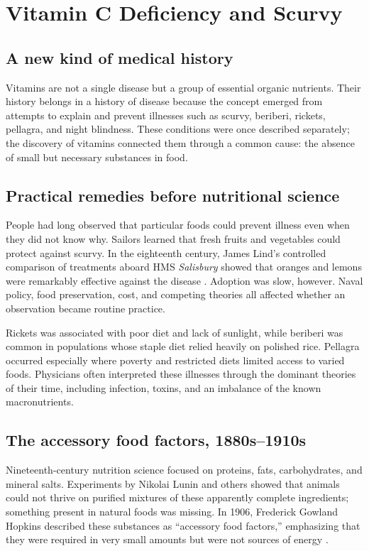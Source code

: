 \documentclass[12pt,oneside]{book}
\begin{document}
\chapter[Vitamin C Deficiency and Scurvy]{Vitamin C Deficiency and Scurvy}

\section{A new kind of medical history}
Vitamins are not a single disease but a group of essential organic nutrients.
Their history belongs in a history of disease because the concept emerged from
attempts to explain and prevent illnesses such as scurvy, beriberi, rickets,
pellagra, and night blindness. These conditions were once described separately;
the discovery of vitamins connected them through a common cause: the absence of
small but necessary substances in food.

\section{Practical remedies before nutritional science}
People had long observed that particular foods could prevent illness even when
they did not know why. Sailors learned that fresh fruits and vegetables could
protect against scurvy. In the eighteenth century, James Lind's controlled
comparison of treatments aboard HMS \emph{Salisbury} showed that oranges and
lemons were remarkably effective against the disease \cite{lind1753}.
Adoption was slow, however. Naval policy, food preservation, cost, and
competing theories all affected whether an observation became routine practice.

Rickets was associated with poor diet and lack of sunlight, while beriberi was
common in populations whose staple diet relied heavily on polished rice.
Pellagra occurred especially where poverty and restricted diets limited access
to varied foods. Physicians often interpreted these illnesses through the
dominant theories of their time, including infection, toxins, and an imbalance
of the known macronutrients.

\section{The accessory food factors, 1880s--1910s}
Nineteenth-century nutrition science focused on proteins, fats, carbohydrates,
and mineral salts. Experiments by Nikolai Lunin and others showed that animals
could not thrive on purified mixtures of these apparently complete ingredients;
something present in natural foods was missing. In 1906, Frederick Gowland
Hopkins described these substances as ``accessory food factors,'' emphasizing
that they were required in very small amounts but were not sources of energy
\cite{hopkins1929}.
\end{document}
